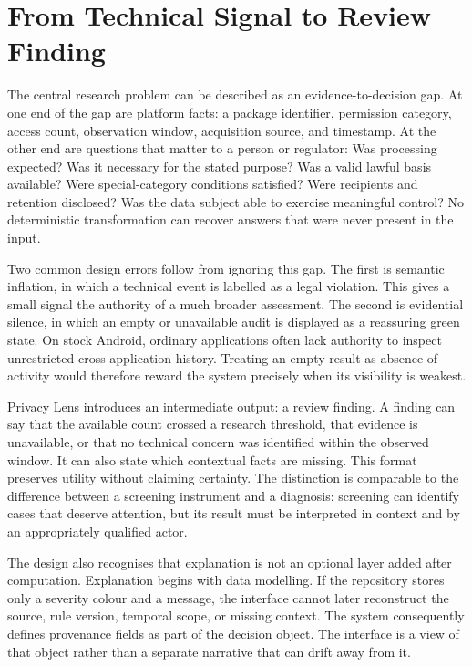 \section{From Technical Signal to Review Finding}

The central research problem can be described as an evidence-to-decision gap. At one end of the gap are platform facts: a package identifier, permission category, access count, observation window, acquisition source, and timestamp. At the other end are questions that matter to a person or regulator: Was processing expected? Was it necessary for the stated purpose? Was a valid lawful basis available? Were special-category conditions satisfied? Were recipients and retention disclosed? Was the data subject able to exercise meaningful control? No deterministic transformation can recover answers that were never present in the input.

Two common design errors follow from ignoring this gap. The first is semantic inflation, in which a technical event is labelled as a legal violation. This gives a small signal the authority of a much broader assessment. The second is evidential silence, in which an empty or unavailable audit is displayed as a reassuring green state. On stock Android, ordinary applications often lack authority to inspect unrestricted cross-application history. Treating an empty result as absence of activity would therefore reward the system precisely when its visibility is weakest.

Privacy Lens introduces an intermediate output: a review finding. A finding can say that the available count crossed a research threshold, that evidence is unavailable, or that no technical concern was identified within the observed window. It can also state which contextual facts are missing. This format preserves utility without claiming certainty. The distinction is comparable to the difference between a screening instrument and a diagnosis: screening can identify cases that deserve attention, but its result must be interpreted in context and by an appropriately qualified actor.

The design also recognises that explanation is not an optional layer added after computation. Explanation begins with data modelling. If the repository stores only a severity colour and a message, the interface cannot later reconstruct the source, rule version, temporal scope, or missing context. The system consequently defines provenance fields as part of the decision object. The interface is a view of that object rather than a separate narrative that can drift away from it.


